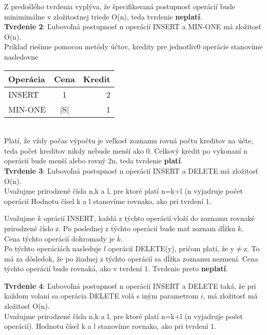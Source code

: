 \documentclass[paper=a4, fontsize=11pt]{scrartcl} %
\numberwithin{equation}{section} %
\numberwithin{figure}{section} %
\numberwithin{table}{section} %
\begin{document}
Z predošlého tvrdenia vyplýva, že špecifikovaná postupnosť operácií bude minimimálne v zložitostnej triede O(n), teda tvrdenie \textbf{neplatí}. \\

\textbf{Tvrdenie 2}: Ľubovoľná postupnosť n operácií INSERT  a MIN-ONE má zložitosť O(n). \\
Príklad riešime pomocou metódy účtov, kredity pre jednotliv0 operácie stanovíme nasledovne \\

  \begin{tabular}{ | l | c | r | }
    \hline
    Operácia & Cena & Kredit \\	
    \hline
    INSERT & 1 & 2 \\ 
    MIN-ONE & |S| & 1 \\
    \hline
  \end{tabular}\\

Platí, že vždy počas výpočtu je veľkosť zoznamu rovná počtu kreditov na účte, teda počet kreditov nikdy nebude menší ako 0.
Celkový kredit po vykonaní n operácií bude menší alebo rovný 2n, teda tvrdenie \textbf{platí}. \\


\textbf{Tvrdenie 3}: Ľubovoľná postupnosť n operácií INSERT a DELETE má zložitosť O(n). \\

Uvažujme prirodzené čísla n,k a l, pre ktoré platí n=k+l (n vyjadruje počet operácií
Hodnotu čísel k a l stanovíme rovnako, ako pri tvrdení 1.

Uvažujme $k$ oprácií INSERT, každá z týchto operácií vloží do zoznamu rovnaké prirodzené číslo z.
Po poslednej z týchto operácií bude mať zoznam dĺžku $k$. \\

Cena týchto operácií dohromady je $k$. \\

Po týchto operáciách nasleduje $l$ operácií DELETE(y), pričom platí, že y$\neq$z. To má za dôsledok, že po žiadnej z týchto operácií sa dĺžka zoznamu nezmení. Cena týchto operácií bude rovnaká, ako v tvrdení 1.
Tvrdenie preto \textbf{neplatí}.

\textbf{Tvrdenie 4}: Ľubovoľná postupnosť n operácií INSERT a DELETE taká, že pri každom volaní sa operácia DELETE volá s iným parametrom $i$, má zložitosť má zložitosť O(n). \\

Uvažujme prirodzené čísla n,k a l, pre ktoré platí n=k+l (n vyjadruje počet operácií).
Hodnotu čísel k a l stanovíme rovnako, ako pri tvrdení 1.
\end{document}
